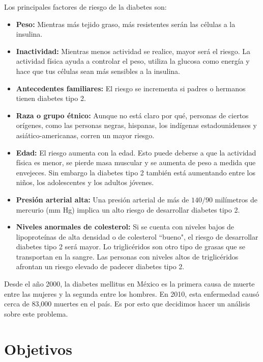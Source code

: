 \documentclass{article}
\begin{document}
Los principales factores de riesgo de la diabetes son:
\begin{itemize}
	\item \textbf{Peso:} Mientras más tejido graso, más resistentes serán las células a la insulina.
	\item \textbf{Inactividad:} Mientras menos actividad se realice, mayor será el riesgo. La actividad física ayuda a controlar el peso, utiliza la glucosa como energía y hace que tus células sean más sensibles a la insulina.
	\item \textbf{Antecedentes familiares:} El riesgo se incrementa si padres o hermanos tienen diabetes tipo 2.
	\item \textbf{Raza o grupo étnico:} Aunque no está claro por qué, personas de ciertos orígenes, como las personas negras, hispanas, los indígenas estadounidenses y asiático-americanas, corren un mayor riesgo.
	\item \textbf{Edad:} El riesgo aumenta con la edad. Esto puede deberse a que la actividad física es menor, se pierde masa muscular y se aumenta de peso a medida que envejeces. Sin embargo la diabetes tipo 2 también está aumentando entre los niños, los adolescentes y los adultos jóvenes.
	\item \textbf{Presión arterial alta:} Una presión arterial de más de $140/90$ milímetros de mercurio (mm Hg) implica un alto riesgo de desarrollar diabetes tipo 2.
	\item \textbf{Niveles anormales de colesterol:} Si se cuenta con niveles bajos de lipoproteínas de alta densidad o de colesterol ``bueno", el riesgo de desarrollar diabetes tipo 2 será mayor. Lo triglicéridos son otro tipo de grasas que se transportan en la sangre. Las personas con niveles altos de triglicéridos afrontan un riesgo elevado de padecer diabetes tipo 2. 
\end{itemize}

Desde el año 2000, la diabetes mellitus en México es la primera causa de muerte entre las mujeres y la segunda entre los hombres. En 2010, esta enfermedad causó cerca de 83,000 muertes en el país. Es por esto que decidimos hacer un análisis sobre este problema.


\section{Objetivos}
\end{document}
